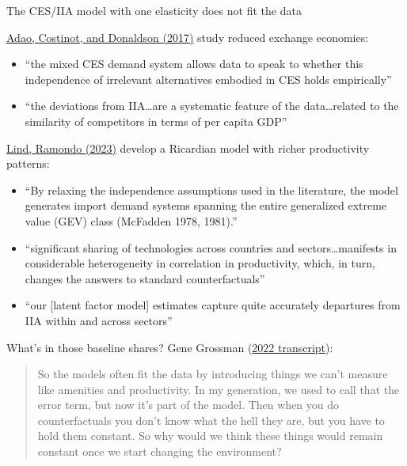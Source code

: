 \documentclass[11pt,notes=hide,aspectratio=169]{beamer}
\begin{document}
\begin{frame}{The CES/IIA model with one elasticity does not fit the data}
{\small
\href{https://www.aeaweb.org/articles?id=10.1257/aer.20150956}{Adao, Costinot, and Donaldson (2017)} study reduced exchange economies:
\begin{itemize}\itemsep-0.1em
\item ``the mixed CES demand system allows data to speak to whether this independence of irrelevant alternatives embodied in CES holds empirically''
\item ``the deviations from IIA\dots are a systematic feature of the data\dots related to the similarity of competitors in terms of per capita GDP''
\end{itemize}
\href{https://www.aeaweb.org/articles?id=10.1257/aer.20190781}{Lind, Ramondo (2023)} develop a Ricardian model with richer productivity patterns:
\begin{itemize}\itemsep-0.1em
\item ``By relaxing the independence assumptions used in the literature, the model generates import demand systems spanning the entire generalized extreme value (GEV) class (McFadden 1978, 1981).''
\item ``significant sharing of technologies across countries and sectors\dots manifests in considerable heterogeneity in correlation in productivity, which, in turn, changes the answers to standard counterfactuals''
\item ``our [latent factor model] estimates capture quite accurately departures from IIA within and across sectors''
\end{itemize}
}\end{frame}
\begin{frame}{What's in those baseline shares?}
Gene Grossman (\href{https://economics.princeton.edu/news/alumni-conversations-gene-grossman-and-mits-david-atkin}{2022 transcript}):
\begin{quote}{
So the models often fit the data by introducing things we can't measure like amenities and productivity. In my generation, we used to call that the error term, but now it's part of the model. Then when you do counterfactuals you don't know what the hell they are, but you have to hold them constant. So why would we think these things would remain constant once we start changing the environment?
\par}\end{quote}
\end{frame}
\end{document}
